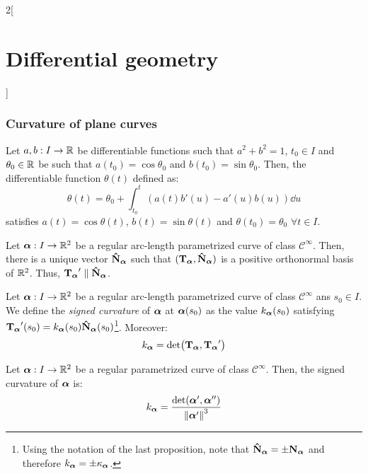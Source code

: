 \documentclass[../../../main.tex]{subfiles}
\begin{document}
\begin{multicols}{2}[\section{Differential geometry}]
  \subsubsection{Curvature of plane curves}
  \begin{lemma}
    Let $a,b:I\rightarrow\mathbb{R}$ be differentiable functions such that $a^2+b^2=1$, $t_0\in I$ and $\theta_0\in\mathbb{R}$ be such that $a(t_0)=\cos\theta_0$ and $b(t_0)=\sin\theta_0$. Then, the differentiable function $\theta(t)$ defined as:
    $$\theta(t)=\theta_0+\int_{t_0}^t\left(a(t)b'(u)-a'(u)b(u)\right)\dd{u}$$
    satisfies $a(t)=\cos\theta(t)$, $b(t)=\sin\theta(t)$ and $\theta(t_0)=\theta_0$ $\forall t\in I$.
  \end{lemma}
  \begin{proposition}
    Let $\boldsymbol{\mathrm{\alpha}}:I\rightarrow\mathbb{R}^2$ be a regular arc-length parametrized curve of class $\mathcal{C}^\infty$. Then, there is a unique vector $\boldsymbol{\mathrm{\hat{N}}}_{\boldsymbol{\mathrm{\alpha}}}$ such that $({\boldsymbol{\mathrm{T}}_{\boldsymbol{\mathrm{\alpha}}}},\boldsymbol{\mathrm{\hat{N}}}_{\boldsymbol{\mathrm{\alpha}}})$ is a positive orthonormal basis of $\mathbb{R}^2$. Thus, ${\boldsymbol{\mathrm{T}}_{\boldsymbol{\mathrm{\alpha}}}}'\parallel \boldsymbol{\mathrm{\hat{N}}}_{\boldsymbol{\mathrm{\alpha}}}$.
  \end{proposition}
  \begin{definition}
    Let $\boldsymbol{\mathrm{\alpha}}:I\rightarrow\mathbb{R}^2$ be a regular arc-length parametrized curve of class $\mathcal{C}^\infty$ ans $s_0\in I$. We define the \emph{signed curvature} of $\boldsymbol{\mathrm{\alpha}}$ at $\boldsymbol{\mathrm{\alpha}}(s_0)$ as the value $k_{\boldsymbol{\mathrm{\alpha}}}(s_0)$ satisfying ${\boldsymbol{\mathrm{T}}_{\boldsymbol{\mathrm{\alpha}}}}'(s_0)=k_{\boldsymbol{\mathrm{\alpha}}}(s_0)\boldsymbol{\mathrm{\hat{N}}}_{\boldsymbol{\mathrm{\alpha}}}(s_0)$\footnote{Using the notation of the last proposition, note that $\boldsymbol{\mathrm{\hat{N}}}_{\boldsymbol{\mathrm{\alpha}}}=\pm{\boldsymbol{\mathrm{N}}_{\boldsymbol{\mathrm{\alpha}}}}$ and therefore $k_{\boldsymbol{\mathrm{\alpha}}}=\pm{\kappa_{\boldsymbol{\mathrm{\alpha}}}}$.}. Moreover: $$k_{\boldsymbol{\mathrm{\alpha}}}=\det({\boldsymbol{\mathrm{T}}_{\boldsymbol{\mathrm{\alpha}}}},{\boldsymbol{\mathrm{T}}_{\boldsymbol{\mathrm{\alpha}}}}')$$
  \end{definition}
  \begin{proposition}
    Let $\boldsymbol{\mathrm{\alpha}}:I\rightarrow\mathbb{R}^2$ be a regular parametrized curve of class $\mathcal{C}^\infty$. Then, the signed curvature of $\boldsymbol{\mathrm{\alpha}}$ is: $$k_{\boldsymbol{\mathrm{\alpha}}}=\frac{\det(\boldsymbol{\mathrm{\alpha}}',\boldsymbol{\mathrm{\alpha}}'')}{{\|\boldsymbol{\mathrm{\alpha}}'\|}^3}$$
  \end{proposition}

\end{multicols}
\end{document}
